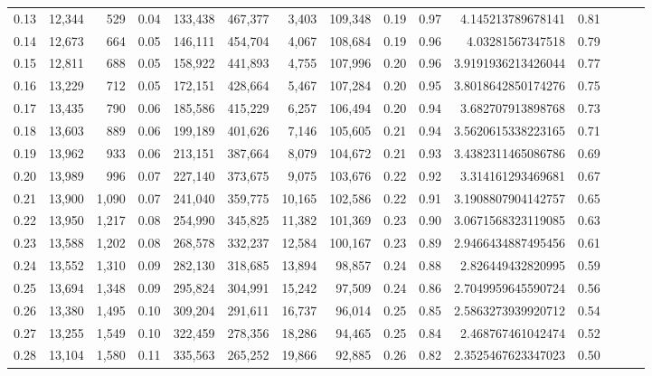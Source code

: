 \begin{tabular}{rrrrrrrrrrrrrrr}
0.13 &  12,344 &    529 &  0.04 &  133,438 &  467,377 &    3,403 &  109,348 &  0.19 &  0.97 &     4.145213789678141 &      0.81 \\
0.14 &  12,673 &    664 &  0.05 &  146,111 &  454,704 &    4,067 &  108,684 &  0.19 &  0.96 &      4.03281567347518 &      0.79 \\
0.15 &  12,811 &    688 &  0.05 &  158,922 &  441,893 &    4,755 &  107,996 &  0.20 &  0.96 &    3.9191936213426044 &      0.77 \\
0.16 &  13,229 &    712 &  0.05 &  172,151 &  428,664 &    5,467 &  107,284 &  0.20 &  0.95 &    3.8018642850174276 &      0.75 \\
0.17 &  13,435 &    790 &  0.06 &  185,586 &  415,229 &    6,257 &  106,494 &  0.20 &  0.94 &     3.682707913898768 &      0.73 \\
0.18 &  13,603 &    889 &  0.06 &  199,189 &  401,626 &    7,146 &  105,605 &  0.21 &  0.94 &    3.5620615338223165 &      0.71 \\
0.19 &  13,962 &    933 &  0.06 &  213,151 &  387,664 &    8,079 &  104,672 &  0.21 &  0.93 &    3.4382311465086786 &      0.69 \\
0.20 &  13,989 &    996 &  0.07 &  227,140 &  373,675 &    9,075 &  103,676 &  0.22 &  0.92 &     3.314161293469681 &      0.67 \\
0.21 &  13,900 &  1,090 &  0.07 &  241,040 &  359,775 &   10,165 &  102,586 &  0.22 &  0.91 &    3.1908807904142757 &      0.65 \\
0.22 &  13,950 &  1,217 &  0.08 &  254,990 &  345,825 &   11,382 &  101,369 &  0.23 &  0.90 &    3.0671568323119085 &      0.63 \\
0.23 &  13,588 &  1,202 &  0.08 &  268,578 &  332,237 &   12,584 &  100,167 &  0.23 &  0.89 &    2.9466434887495456 &      0.61 \\
0.24 &  13,552 &  1,310 &  0.09 &  282,130 &  318,685 &   13,894 &   98,857 &  0.24 &  0.88 &     2.826449432820995 &      0.59 \\
0.25 &  13,694 &  1,348 &  0.09 &  295,824 &  304,991 &   15,242 &   97,509 &  0.24 &  0.86 &    2.7049959645590724 &      0.56 \\
0.26 &  13,380 &  1,495 &  0.10 &  309,204 &  291,611 &   16,737 &   96,014 &  0.25 &  0.85 &    2.5863273939920712 &      0.54 \\
0.27 &  13,255 &  1,549 &  0.10 &  322,459 &  278,356 &   18,286 &   94,465 &  0.25 &  0.84 &     2.468767461042474 &      0.52 \\
0.28 &  13,104 &  1,580 &  0.11 &  335,563 &  265,252 &   19,866 &   92,885 &  0.26 &  0.82 &    2.3525467623347023 &      0.50 \\

\end{tabular}
